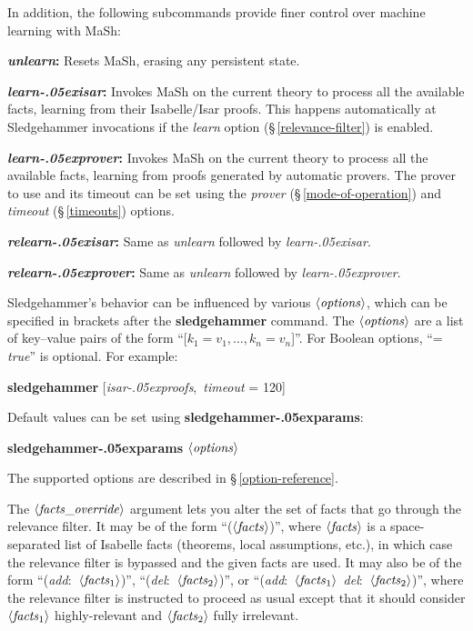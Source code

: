 \documentclass[a4paper,12pt]{article}
\let\oldS=\S
\def\S{\oldS\,}
\def\qty#1{\ensuremath{\left<\mathit{#1\/}\right>}}
\renewcommand\_{\hbox{\textunderscore\kern-.05ex}}
\begin{document}
In addition, the following subcommands provide finer control over machine
learning with MaSh:

\begin{enum}
\item[\labelitemi] \textbf{\textit{unlearn}:} Resets MaSh, erasing any
persistent state.

\item[\labelitemi] \textbf{\textit{learn\_isar}:} Invokes MaSh on the current
theory to process all the available facts, learning from their Isabelle/Isar
proofs. This happens automatically at Sledgehammer invocations if the
\textit{learn} option (\S\ref{relevance-filter}) is enabled.

\item[\labelitemi] \textbf{\textit{learn\_prover}:} Invokes MaSh on the current
theory to process all the available facts, learning from proofs generated by
automatic provers. The prover to use and its timeout can be set using the
\textit{prover} (\S\ref{mode-of-operation}) and \textit{timeout}
(\S\ref{timeouts}) options.

\item[\labelitemi] \textbf{\textit{relearn\_isar}:} Same as \textit{unlearn}
followed by \textit{learn\_isar}.

\item[\labelitemi] \textbf{\textit{relearn\_prover}:} Same as \textit{unlearn}
followed by \textit{learn\_prover}.
\end{enum}

Sledgehammer's behavior can be influenced by various \qty{options}, which can be
specified in brackets after the \textbf{sledgehammer} command. The
\qty{options} are a list of key--value pairs of the form ``[$k_1 = v_1,
\ldots, k_n = v_n$]''. For Boolean options, ``= \textit{true\/}'' is optional.
For example:

\prew
\textbf{sledgehammer} [\textit{isar\_proofs}, \,\textit{timeout} = 120]
\postw

Default values can be set using \textbf{sledgehammer\_\allowbreak params}:

\prew
\textbf{sledgehammer\_params} \qty{options}
\postw

The supported options are described in \S\ref{option-reference}.

The \qty{facts\_override} argument lets you alter the set of facts that go
through the relevance filter. It may be of the form ``(\qty{facts})'', where
\qty{facts} is a space-separated list of Isabelle facts (theorems, local
assumptions, etc.), in which case the relevance filter is bypassed and the given
facts are used. It may also be of the form ``(\textit{add}:\ \qty{facts\/_{\mathrm{1}}})'',
``(\textit{del}:\ \qty{facts\/_{\mathrm{2}}})'', or ``(\textit{add}:\ \qty{facts\/_{\mathrm{1}}}\
\textit{del}:\ \qty{facts\/_{\mathrm{2}}})'', where the relevance filter is instructed to
proceed as usual except that it should consider \qty{facts\/_{\mathrm{1}}}
highly-relevant and \qty{facts\/_{\mathrm{2}}} fully irrelevant.
\end{document}
